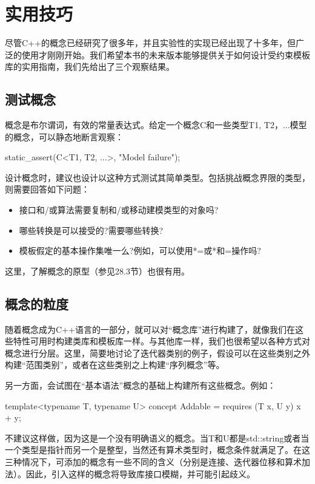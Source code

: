 \section{实用技巧}

尽管C++的概念已经研究了很多年，并且实验性的实现已经出现了十多年，但广泛的使用才刚刚开始。我们希望本书的未来版本能够提供关于如何设计受约束模板库的实用指南，我们先给出了三个观察结果。

\subsection{测试概念}

概念是布尔谓词，有效的常量表达式。给定一个概念C和一些类型T1, T2，...模型的概念，可以静态地断言观察：

\begin{cpp}
static_assert(C<T1, T2, ...>, "Model failure");
\end{cpp}

设计概念时，建议也设计以这种方式测试其简单类型。包括挑战概念界限的类型，则需要回答如下问题：

\begin{itemize}
\item 
接口和/或算法需要复制和/或移动建模类型的对象吗?

\item 
哪些转换是可以接受的?需要哪些转换?

\item 
模板假定的基本操作集唯一么?例如，可以使用*=或*和=操作吗?
\end{itemize}

这里，了解概念的原型（参见28.3节）也很有用。

\subsection{概念的粒度}

随着概念成为C++语言的一部分，就可以对“概念库”进行构建了，就像我们在这些特性可用时构建类库和模板库一样。与其他库一样，我们也很希望以各种方式对概念进行分层。这里，简要地讨论了迭代器类别的例子，假设可以在这些类别之外构建“范围类别”，或者在这些类别之上构建“序列概念”等。

另一方面，会试图在“基本语法”概念的基础上构建所有这些概念。例如：

\begin{cpp}
template<typename T, typename U>
concept Addable =
requires (T x, U y) {
	x + y;
}
\end{cpp}

不建议这样做，因为这是一个没有明确语义的概念。当T和U都是std::string或者当一个类型是指针而另一个是整型，当然还有算术类型时，概念条件就满足了。在这三种情况下，可添加的概念有一些不同的含义（分别是连接、迭代器位移和算术加法）。因此，引入这样的概念将导致库接口模糊，并可能引起歧义。

